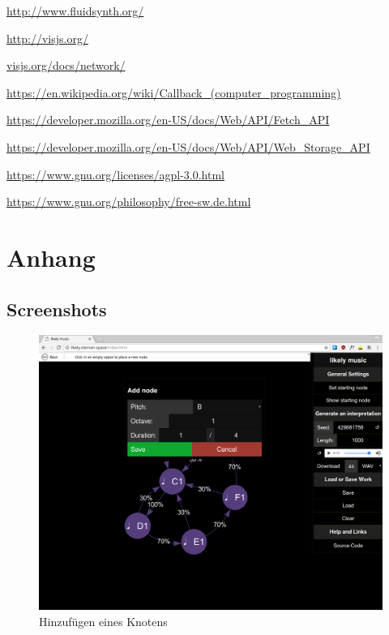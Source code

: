 \documentclass[a4paper,twocolumn]{article}
\begin{document}
\begin{thebibliography}{9}
  \url{http://www.fluidsynth.org/}

  \url{http://visjs.org/}

  \url{visjs.org/docs/network/}

  \url{https://en.wikipedia.org/wiki/Callback_(computer_programming)}

  \url{https://developer.mozilla.org/en-US/docs/Web/API/Fetch_API}

  \url{https://developer.mozilla.org/en-US/docs/Web/API/Web_Storage_API}

  \url{https://www.gnu.org/licenses/agpl-3.0.html}

  \url{https://www.gnu.org/philosophy/free-sw.de.html}
\end{thebibliography}

\clearpage
\onecolumn

\section*{Anhang}

\subsection*{Screenshots}
\begin{figure}[H]
  \begin{center}
  \includegraphics[width=.7\textwidth]{screenshots/add-node.png}
  \end{center}
  \caption{Hinzufügen eines Knotens}
\end{figure}
\end{document}
